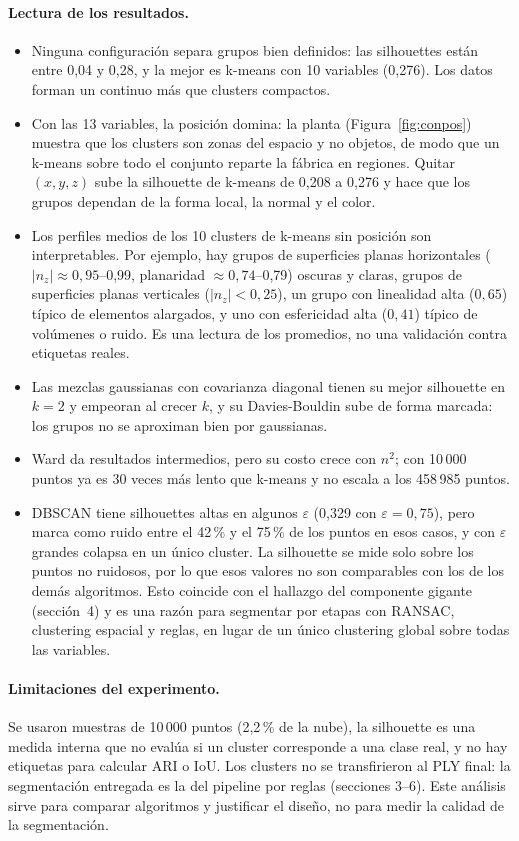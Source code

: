 \documentclass[11pt,a4paper]{article}
\begin{document}
\paragraph{Lectura de los resultados.}
\begin{itemize}
\item Ninguna configuración separa grupos bien definidos: las silhouettes están entre 0,04 y 0,28, y la mejor es k-means con 10 variables (0,276). Los datos forman un continuo más que clusters compactos.
\item Con las 13 variables, la posición domina: la planta (Figura~\ref{fig:conpos}) muestra que los clusters son zonas del espacio y no objetos, de modo que un k-means sobre todo el conjunto reparte la fábrica en regiones. Quitar $(x,y,z)$ sube la silhouette de k-means de 0,208 a 0,276 y hace que los grupos dependan de la forma local, la normal y el color.
\item Los perfiles medios de los 10 clusters de k-means sin posición son interpretables. Por ejemplo, hay grupos de superficies planas horizontales ($|n_z|\approx0{,}95$--0,99, planaridad $\approx0{,}74$--0,79) oscuras y claras, grupos de superficies planas verticales ($|n_z|<0{,}25$), un grupo con linealidad alta ($0{,}65$) típico de elementos alargados, y uno con esfericidad alta ($0{,}41$) típico de volúmenes o ruido. Es una lectura de los promedios, no una validación contra etiquetas reales.
\item Las mezclas gaussianas con covarianza diagonal tienen su mejor silhouette en $k=2$ y empeoran al crecer $k$, y su Davies-Bouldin sube de forma marcada: los grupos no se aproximan bien por gaussianas.
\item Ward da resultados intermedios, pero su costo crece con $n^2$; con 10\,000 puntos ya es 30 veces más lento que k-means y no escala a los 458\,985 puntos.
\item DBSCAN tiene silhouettes altas en algunos $\varepsilon$ (0,329 con $\varepsilon=0{,}75$), pero marca como ruido entre el 42\,\% y el 75\,\% de los puntos en esos casos, y con $\varepsilon$ grandes colapsa en un único cluster. La silhouette se mide solo sobre los puntos no ruidosos, por lo que esos valores no son comparables con los de los demás algoritmos. Esto coincide con el hallazgo del componente gigante (sección~4) y es una razón para segmentar por etapas con RANSAC, clustering espacial y reglas, en lugar de un único clustering global sobre todas las variables.
\end{itemize}

\paragraph{Limitaciones del experimento.} Se usaron muestras de 10\,000 puntos (2,2\,\% de la nube), la silhouette es una medida interna que no evalúa si un cluster corresponde a una clase real, y no hay etiquetas para calcular ARI o IoU. Los clusters no se transfirieron al PLY final: la segmentación entregada es la del pipeline por reglas (secciones 3--6). Este análisis sirve para comparar algoritmos y justificar el diseño, no para medir la calidad de la segmentación.
\end{document}
